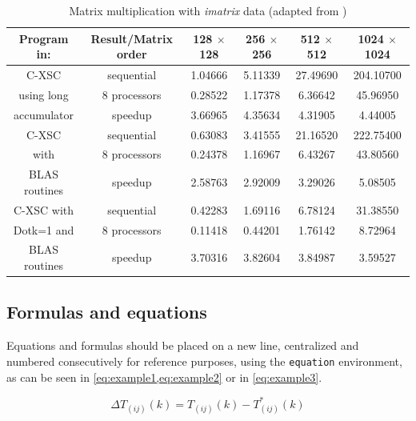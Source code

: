 \documentclass[alpha-refs,brazilian]{RBCA_v3.0}
\begin{document}
\begin{table}[ht]
	\caption{Matrix multiplication with \emph{imatrix} data (adapted from \citep{Holbig2003})}\label{tab:example:wide}
	\begin{tabularx}{\linewidth}{c c C C C C}
		\toprule
	    \textbf{Program in:} & Result/Matrix order  & \textbf{128 $\times$ 128} & \textbf{256 $\times$ 256} & \textbf{512 $\times$ 512} & \textbf{1024 $\times$ 1024}\\
		\midrule
        C-XSC     & sequential  & 1.04666 & 5.11339 & 27.49690 & 204.10700 \\
        using long          & 8 processors & 0.28522 & 1.17378 & 6.36642 & 45.96950 \\
        accumulator          & speedup & 3.66965 & 4.35634 & 4.31905 & 4.44005 \\
        \hline
        C-XSC & sequential & 0.63083 & 3.41555 & 21.16520 & 222.75400 \\
        with     & 8 processors & 0.24378 & 1.16967 & 6.43267 & 43.80560 \\
        BLAS routines          & speedup & 2.58763 & 2.92009 & 3.29026 & 5.08505 \\
        \hline
        C-XSC with & sequential & 0.42283 & 1.69116 & 6.78124 & 31.38550 \\
        Dotk=1 and          & 8 processors & 0.11418 & 0.44201 & 1.76142 & 8.72964 \\
        BLAS routines          & speedup & 3.70316 & 3.82604 & 3.84987 & 3.59527 \\
		\bottomrule
	\end{tabularx}
\end{table}

\subsection{Formulas and equations}
Equations and formulas should be placed on a new line, centralized and numbered consecutively for reference purposes, using the \verb|equation| environment, as can be seen in \cref{eq:example1,eq:example2} or in \cref{eq:example3}.  

\begin{equation}
	\Delta T_{(ij)} (\textit{k})= T_{(ij)} (\textit{k}) - T^*_{(ij)} (\textit{k})
\label{eq:example1}
\end{equation}
\end{document}
